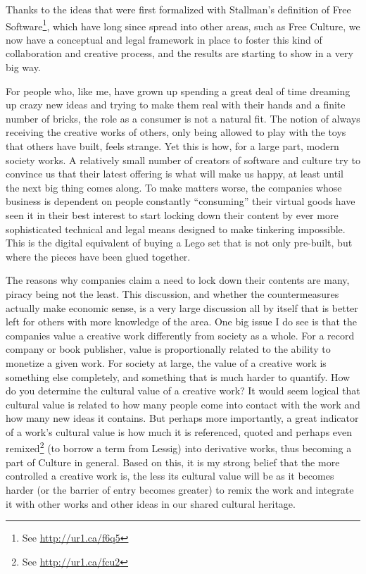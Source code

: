 Thanks to the ideas that were f\hbox{}irst formalized with Stallman's definition
of Free Software\footnote{See \url{http://ur1.ca/f6q5}},
which have long since spread into other areas, such as Free Culture, we now have
a conceptual and legal framework in place to foster this kind of collaboration
and creative process, and the results are starting to show in a very big way. 

For people who, like me, have grown up spending a great deal of time dreaming up
crazy new ideas and trying to make them real with their hands and a
f\hbox{}inite number of bricks, the role as a consumer is not a natural
f\hbox{}it. The notion of always receiving the creative works of others, only
being allowed to play with the toys that others have built, feels strange. Yet
this is how, for a large part, modern society works. A relatively small number
of creators of software and culture try to convince us that their latest
of\hbox{}fering is what will make us happy, at least until the next big thing
comes along. To make matters worse, the companies whose business is dependent on
people constantly ``consuming'' their virtual goods have seen it in their best
interest to start locking down their content by ever more sophisticated
technical and legal means designed to make tinkering impossible. This is the
digital equivalent of buying a Lego set that is not only pre-built, but where
the pieces have been glued together.

The reasons why companies claim a need to lock down their contents are many,
piracy being not the least. This discussion, and whether the countermeasures
actually make economic sense, is a very large discussion all by itself that is
better left for others with more knowledge of the area. One big issue I do see
is that the companies value a creative work dif\hbox{}ferently from society as a
whole.  For a record company or book publisher, value is proportionally related
to the ability to monetize a given work. For society at large, the value of a
creative work is something else completely, and something that is much harder to
quantify. How do you determine the cultural value of a creative work? It would
seem logical that cultural value is related to how many people come into contact
with the work and how many new ideas it contains. But perhaps more importantly,
a great indicator of a work's cultural value is how much it is referenced,
quoted and perhaps even remixed\footnote{See \url{http://ur1.ca/fcu2}} (to
borrow a term from Lessig) into derivative works, thus becoming a part of
Culture in general. Based on this, it is my strong belief that the more
controlled a creative work is, the less its cultural value will be as it becomes
harder (or the barrier of entry becomes greater) to remix the work and integrate
it with other works and other ideas in our shared cultural heritage.



